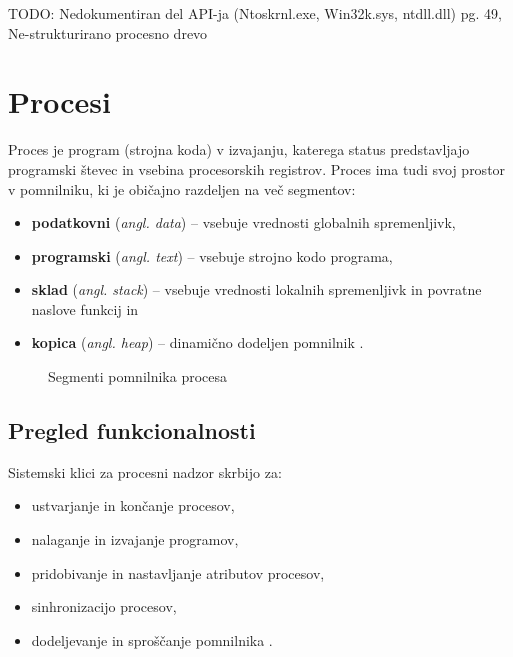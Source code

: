 \documentclass[a4paper,12pt,openright]{book}
\begin{document}
TODO: Nedokumentiran del API-ja (Ntoskrnl.exe, Win32k.sys, ntdll.dll) pg. 49, Ne-strukturirano procesno drevo

\chapter{Procesi}

Proces je program (strojna koda) v izvajanju, katerega status predstavljajo programski števec in vsebina procesorskih registrov.
Proces ima tudi svoj prostor v pomnilniku, ki je običajno razdeljen na več segmentov:
\begin{itemize}
	\item \textbf{podatkovni} (\textit{angl. data}) -- vsebuje vrednosti globalnih spremenljivk,
	\item \textbf{programski} (\textit{angl. text}) -- vsebuje strojno kodo programa,
	\item \textbf{sklad} (\textit{angl. stack}) -- vsebuje vrednosti lokalnih spremenljivk in povratne naslove funkcij in
	\item \textbf{kopica} (\textit{angl. heap}) -- dinamično dodeljen pomnilnik \cite{Silberschatz_Galvin_Gagne_2018}.
\end{itemize}

\begin{figure}[h!]
	\begin{center}
	\end{center}
	\caption{Segmenti pomnilnika procesa}
\end{figure}

\section{Pregled funkcionalnosti}

Sistemski klici za procesni nadzor skrbijo za:
\begin{itemize}
	\item ustvarjanje in končanje procesov,
	\item nalaganje in izvajanje programov,
	\item pridobivanje in nastavljanje atributov procesov,
	\item sinhronizacijo procesov,
	\item dodeljevanje in sproščanje pomnilnika \cite{Silberschatz_Galvin_Gagne_2018}.
\end{itemize}
\end{document}
